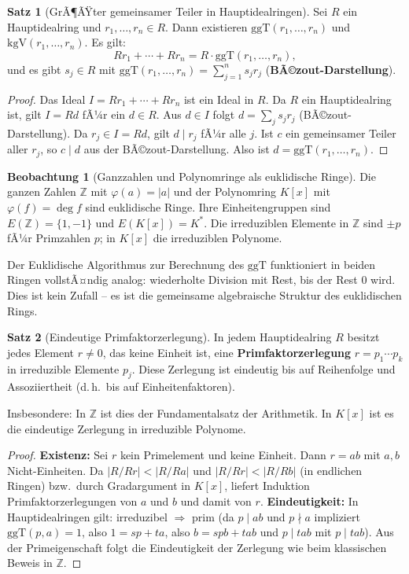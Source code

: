﻿\documentclass[a4paper,12pt]{report}
\theoremstyle{definition}
\newtheorem{satz}{Satz}
\newtheorem{beobachtung}{Beobachtung}
\begin{document}
\begin{satz}[GrÃ¶ÃŸter gemeinsamer Teiler in Hauptidealringen]
    Sei $R$ ein Hauptidealring und $r_1, \dots, r_n \in R$.
    Dann existieren $\mathrm{ggT}(r_1, \dots, r_n)$ und
    $\mathrm{kgV}(r_1, \dots, r_n)$. Es gilt:
    \[
        R r_1 + \cdots + R r_n = R \cdot \mathrm{ggT}(r_1, \dots, r_n),
    \]
    und es gibt $s_j \in R$ mit
    $\mathrm{ggT}(r_1, \dots, r_n) = \sum_{j=1}^n s_j r_j$
    (\textbf{BÃ©zout-Darstellung}).
\end{satz}
\begin{proof}
    Das Ideal $I = Rr_1 + \cdots + Rr_n$ ist ein Ideal in $R$.
    Da $R$ ein Hauptidealring ist, gilt $I = Rd$ fÃ¼r ein $d \in R$.
    Aus $d \in I$ folgt $d = \sum_j s_j r_j$ (BÃ©zout-Darstellung).
    Da $r_j \in I = Rd$, gilt $d \mid r_j$ fÃ¼r alle $j$.
    Ist $c$ ein gemeinsamer Teiler aller $r_j$, so $c \mid d$ aus der
    BÃ©zout-Darstellung. Also ist $d = \mathrm{ggT}(r_1, \ldots, r_n)$.
\end{proof}

\begin{beobachtung}[Ganzzahlen und Polynomringe als euklidische Ringe]
    Die ganzen Zahlen $\mathbb{Z}$ mit $\varphi(a) = |a|$ und der
    Polynomring $K[x]$ mit $\varphi(f) = \deg f$ sind euklidische Ringe.
    Ihre Einheitengruppen sind $E(\mathbb{Z}) = \{1, -1\}$ und
    $E(K[x]) = K^*$. Die irreduziblen Elemente in $\mathbb{Z}$ sind
    $\pm p$ fÃ¼r Primzahlen $p$; in $K[x]$ die irreduziblen Polynome.

    Der Euklidische Algorithmus zur Berechnung des $\mathrm{ggT}$
    funktioniert in beiden Ringen vollstÃ¤ndig analog: wiederholte
    Division mit Rest, bis der Rest $0$ wird. Dies ist kein Zufall --
    es ist die gemeinsame algebraische Struktur des euklidischen Rings.
\end{beobachtung}

\begin{satz}[Eindeutige Primfaktorzerlegung]
    In jedem Hauptidealring $R$ besitzt jedes Element $r \neq 0$,
    das keine Einheit ist, eine \textbf{Primfaktorzerlegung}
    $r = p_1 \cdots p_k$ in irreduzible Elemente $p_j$. Diese
    Zerlegung ist eindeutig bis auf Reihenfolge und Assoziiertheit
    (d.\,h.\ bis auf Einheitenfaktoren).

    Insbesondere: In $\mathbb{Z}$ ist dies der Fundamentalsatz der
    Arithmetik. In $K[x]$ ist es die eindeutige Zerlegung in
    irreduzible Polynome.
\end{satz}
\begin{proof}
    \textbf{Existenz:} Sei $r$ kein Primelement und keine Einheit. Dann
    $r = ab$ mit $a, b$ Nicht-Einheiten. Da $|R/Rr| < |R/Ra|$ und $|R/Rr| < |R/Rb|$
    (in endlichen Ringen) bzw.\ durch Gradargument in $K[x]$, liefert Induktion
    Primfaktorzerlegungen von $a$ und $b$ und damit von $r$.
    \textbf{Eindeutigkeit:} In Hauptidealringen gilt: irreduzibel $\Rightarrow$ prim
    (da $p \mid ab$ und $p \nmid a$ impliziert $\mathrm{ggT}(p, a) = 1$, also
    $1 = sp + ta$, also $b = spb + tab$ und $p \mid tab$ mit $p \mid tab$).
    Aus der Primeigenschaft folgt die Eindeutigkeit der Zerlegung wie beim klassischen
    Beweis in $\mathbb{Z}$.
\end{proof}
\end{document}
